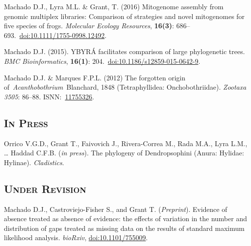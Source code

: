 {\begin{hangparas}{.25in}{1}
		Machado D.J., Lyra M.L. \& Grant, T. (2016) Mitogenome assembly from genomic multiplex libraries: Comparison of strategies and novel mitogenomes for five species of frogs. \emph{Molecular Ecology Resources}, \textbf{16(3)}: 686--693.~\href{https://doi.org/10.1111/1755-0998.12492}{doi:10.1111/1755-0998.12492}.

		Machado D.J. (2015). YBYRÁ facilitates comparison of large phylogenetic trees. \emph{BMC Bioinformatics}, \textbf{16(1)}: 204.~\href{https://doi.org/10.1186/s12859-015-0642-9}{doi:10.1186/s12859-015-0642-9}.

		Machado D.J. \& Marques F.P.L. (2012) The forgotten origin of~\emph{Acanthobothrium}~Blanchard, 1848 (Tetraphyllidea: Onchobothriidae). \emph{Zootaxa} \emph{3505}: 86--88. ISNN:~\href{http://www.mapress.com/zootaxa/2012/f/z03505p088f.pdf}{11755326}.

		\end{hangparas}
	}

\subsection{\textsc{In Press}}

	{
	\setlength{\parskip}{.5em}\renewcommand{\baselinestretch}{2.0}
	\begin{hangparas}{.25in}{1}
			
		Orrico V.G.D., Grant T., Faivovich J., Rivera-Correa M., Rada M.A., Lyra L.M., … Haddad C.F.B. (\emph{in press}). The phylogeny of Dendropsophini (Anura: Hylidae: Hylinae). \emph{Cladistics}.
			
	\end{hangparas}
}

\subsection{\textsc{Under Revision}}

	{
	\setlength{\parskip}{.5em}\renewcommand{\baselinestretch}{2.0}
	\begin{hangparas}{.25in}{1}
			
		Machado D.J., Castroviejo-Fisher S., and Grant T. (\emph{Preprint}). Evidence of absence treated as absence of evidence: the effects of variation in the number and distribution of gaps treated as missing data on the results of standard maximum likelihood analysis. \emph{bioRxiv}, \href{https://doi.org/10.1101/755009}{doi:10.1101/755009}.
			
	\end{hangparas}
}
